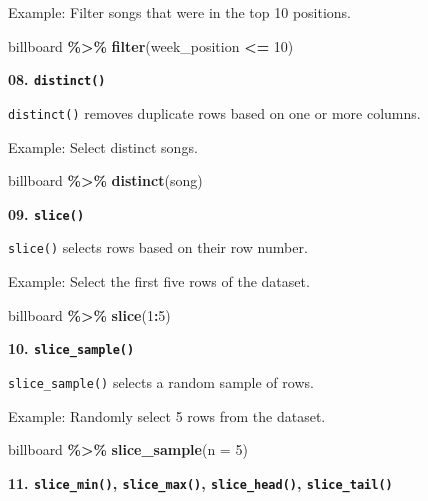 \documentclass[
]{book}
\newenvironment{Shaded}{\begin{snugshade}}{\end{snugshade}}
\newcommand{\AttributeTok}[1]{\textcolor[rgb]{0.13,0.29,0.53}{#1}}
\newcommand{\DecValTok}[1]{\textcolor[rgb]{0.00,0.00,0.81}{#1}}
\newcommand{\FunctionTok}[1]{\textcolor[rgb]{0.13,0.29,0.53}{\textbf{#1}}}
\newcommand{\NormalTok}[1]{#1}
\newcommand{\SpecialCharTok}[1]{\textcolor[rgb]{0.81,0.36,0.00}{\textbf{#1}}}
\begin{document}
Example: Filter songs that were in the top 10 positions.

\begin{Shaded}
\begin{Highlighting}[]
\NormalTok{billboard }\SpecialCharTok{\%\textgreater{}\%}
  \FunctionTok{filter}\NormalTok{(week\_position }\SpecialCharTok{\textless{}=} \DecValTok{10}\NormalTok{)}
\end{Highlighting}
\end{Shaded}

\textbf{08. \texttt{distinct()}}

\texttt{distinct()} removes duplicate rows based on one or more columns.

Example: Select distinct songs.

\begin{Shaded}
\begin{Highlighting}[]
\NormalTok{billboard }\SpecialCharTok{\%\textgreater{}\%}
  \FunctionTok{distinct}\NormalTok{(song)}
\end{Highlighting}
\end{Shaded}

\textbf{09. \texttt{slice()}}

\texttt{slice()} selects rows based on their row number.

Example: Select the first five rows of the dataset.

\begin{Shaded}
\begin{Highlighting}[]
\NormalTok{billboard }\SpecialCharTok{\%\textgreater{}\%}
  \FunctionTok{slice}\NormalTok{(}\DecValTok{1}\SpecialCharTok{:}\DecValTok{5}\NormalTok{)}
\end{Highlighting}
\end{Shaded}

\textbf{10. \texttt{slice\_sample()}}

\texttt{slice\_sample()} selects a random sample of rows.

Example: Randomly select 5 rows from the dataset.

\begin{Shaded}
\begin{Highlighting}[]
\NormalTok{billboard }\SpecialCharTok{\%\textgreater{}\%}
  \FunctionTok{slice\_sample}\NormalTok{(}\AttributeTok{n =} \DecValTok{5}\NormalTok{)}
\end{Highlighting}
\end{Shaded}

\textbf{11. \texttt{slice\_min()}, \texttt{slice\_max()}, \texttt{slice\_head()}, \texttt{slice\_tail()}}
\end{document}

